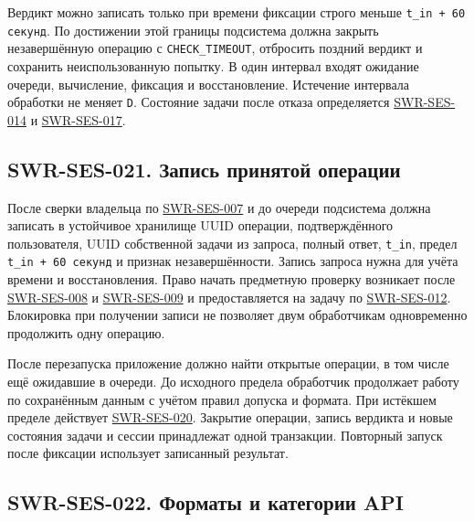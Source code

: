 \documentclass[12pt,a4paper]{article}
\begin{document}
\hypertarget{swr-ses-020-предел-обработки}{}

\hypertarget{swr-ses-020}{}

Вердикт можно записать только при времени фиксации строго меньше \texttt{t\_\allowbreak{}in + 60 секунд}. По достижении этой границы подсистема должна закрыть незавершённую операцию с \texttt{CHECK\_\allowbreak{}TIMEOUT}, отбросить поздний вердикт и сохранить неиспользованную попытку. В один интервал входят ожидание очереди, вычисление, фиксация и восстановление. Истечение интервала обработки не меняет \texttt{D}. Состояние задачи после отказа определяется {\hyperlink{swr-ses-014}{SWR-SES-014}} и {\hyperlink{swr-ses-017}{SWR-SES-017}}.

\subsection{SWR-SES-021. Запись принятой операции}\label{swr-ses-021-ux437ux430ux43fux438ux441ux44c-ux43fux440ux438ux43dux44fux442ux43eux439-ux43eux43fux435ux440ux430ux446ux438ux438}

\hypertarget{swr-ses-021-запись-принятой-операции}{}

\hypertarget{swr-ses-021}{}

После сверки владельца по {\hyperlink{swr-ses-007}{SWR-SES-007}} и до очереди подсистема должна записать в устойчивое хранилище UUID операции, подтверждённого пользователя, UUID собственной задачи из запроса, полный ответ, \texttt{t\_in}, предел \texttt{t\_\allowbreak{}in + 60 секунд} и признак незавершённости. Запись запроса нужна для учёта времени и восстановления. Право начать предметную проверку возникает после {\hyperlink{swr-ses-008}{SWR-SES-008}} и {\hyperlink{swr-ses-009}{SWR-SES-009}} и предоставляется на задачу по {\hyperlink{swr-ses-012}{SWR-SES-012}}. Блокировка при получении записи не позволяет двум обработчикам одновременно продолжить одну операцию.

После перезапуска приложение должно найти открытые операции, в том числе ещё ожидавшие в очереди. До исходного предела обработчик продолжает работу по сохранённым данным с учётом правил допуска и формата. При истёкшем пределе действует {\hyperlink{swr-ses-020}{SWR-SES-020}}. Закрытие операции, запись вердикта и новые состояния задачи и сессии принадлежат одной транзакции. Повторный запуск после фиксации использует записанный результат.

\subsection{SWR-SES-022. Форматы и категории API}\label{swr-ses-022-ux444ux43eux440ux43cux430ux442ux44b-ux438-ux43aux430ux442ux435ux433ux43eux440ux438ux438-api}
\end{document}
